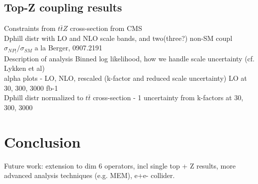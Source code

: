 \documentclass[preprint]{JHEP3} %
\begin{document}
\subsection{Top-Z coupling results}
Constraints from $t\bar{t}Z$ cross-section from CMS \\
Dphill distr with LO and NLO scale bands, and two(three?) non-SM coupl\\
$\sigma_{NP|} / \sigma_{SM}$ a la Berger, 0907.2191 \\
Description of analysis Binned log likelihood, how we handle scale uncertainty (cf. Lykken et al) \\
alpha plots - LO, NLO, rescaled (k-factor and reduced scale uncertainty) LO at 30, 300, 3000 fb-1\\
Dphill distr normalized to $t\bar{t}$ cross-section  - 1 uncertainty from k-factors at 30, 300, 3000\\

\section{Conclusion}
Future work: extension to dim 6 operators, incl single top + Z results, more advanced analysis techniques (e.g. MEM), e+e- collider.
%
\end{document}
